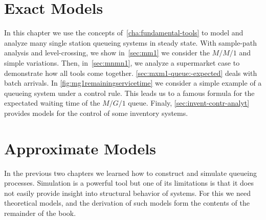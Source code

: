 







\chapter{Exact Models}
\label{cha:analytical-models}


In this chapter we use the concepts of~\cref{cha:fundamental-tools} to model and analyze many single station queueing systems in steady state.
With sample-path analysis and level-crossing, we show in~\cref{sec:mm1} we consider the $M/M/1$ and simple variations.
Then, in~\cref{sec:mnmn1}, we analyze a supermarket case to demonstrate how all tools come together.
\cref{sec:mxm1-queue:-expected} deals with batch arrivals.
In \cref{fig:mg1remainingservicetime} we consider a simple example of a queueing system under a control rule.
This leads us to a famous formula for the expectated waiting time of the $M/G/1$ queue. Finaly, \cref{sec:invent-contr-analyt} provides models for the control of some inventory systems.











\chapter{Approximate Models}
\label{cha:approximate-models}


In the previous two chapters we learned how to construct and simulate queueing processes.
Simulation is a powerful tool but one of its limitations is that it does not easily provide insight into structural behavior of systems.
For this we need theoretical models, and the derivation of such models form the contents of the remainder of the book.


